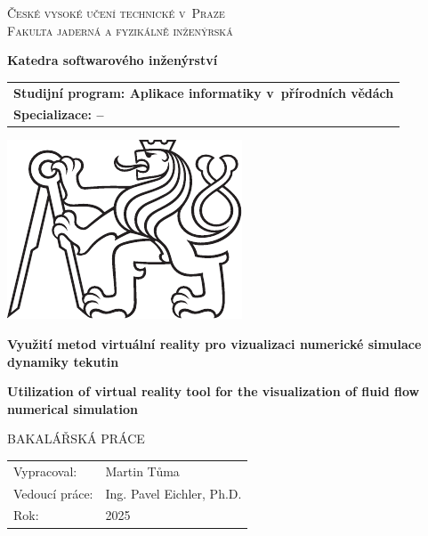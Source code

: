 \documentclass[a4paper,oneside,12pt]{book}
\newcommand{\tb}{\textbf} %
\newcommand{\cvut}{České vysoké učení technické v~Praze}
\newcommand{\fjfi}{Fakulta jaderná a fyzikálně inženýrská}
\newcommand{\katedra}{Katedra softwarového inženýrství}
\newcommand{\program}{Aplikace informatiky v~přírodních vědách} %
\newcommand{\spec}{--} %
\newcommand{\druh}{Bakalářská práce} %
\newcommand{\logoCVUT}{\includegraphics{symbol_cvut_konturova_verze_cb.pdf}} %
\newcommand{\nazevcz}{Využití metod virtuální reality pro vizualizaci numerické simulace dynamiky tekutin}    %
\newcommand{\nazeven}{Utilization of virtual reality tool for the visualization of fluid flow numerical simulation}          %
\newcommand{\autor}{Martin Tůma}   %
\newcommand{\vedouci}{Ing. Pavel Eichler, Ph.D.} %
\newcommand{\rok}{2025}  %
\begin{document}
\thispagestyle{empty}

\begin{center}
    {\Large \textsc{\cvut}\\[4mm] \textsc{\fjfi}}\par
    \vspace{4mm}
	\tb{\katedra} \par\vspace{3mm}

    \begin{tabular}{l}
		\tb{Studijní program: \program}\\
		\tb{Specializace: \spec}\\
    \end{tabular}

   \vspace{10mm} \logoCVUT \vspace{15mm} 

   {\huge \tb{\nazevcz}\par}
   \vspace{5mm}   
   {\huge \tb{\nazeven}\par}
   
   \vspace{15mm}
   {\Large \MakeUppercase{\druh}}

   \vfill
   {\large
    \begin{tabular}{ll}
    Vypracoval: & \autor\\
    Vedoucí práce: & \vedouci\\
    Rok: & \rok
    \end{tabular}
   }
\end{center}

\newpage  %
\thispagestyle{empty} %

\end{document}
